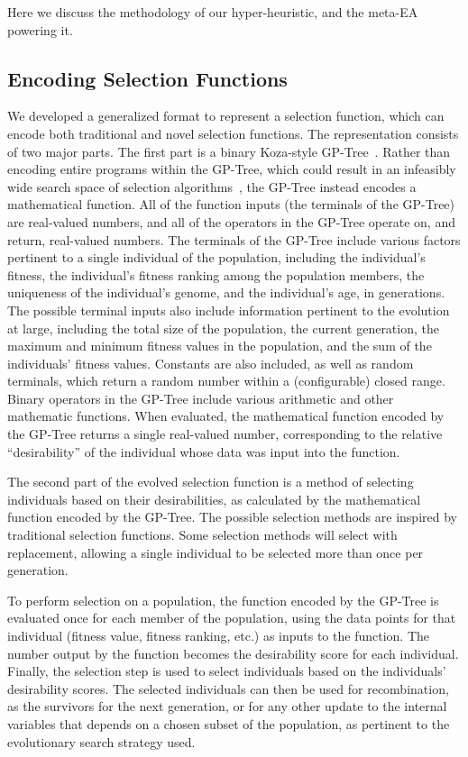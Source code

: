 \documentclass[sigconf]{acmart}
\begin{document}
Here we discuss the methodology of our hyper-heuristic, and the meta-EA powering it. 

\subsection{Encoding Selection Functions}
\label{Methodology-Encoding Selection Functions}

We developed a generalized format to represent a selection function, which can encode both traditional and novel selection functions. The representation consists of two major parts. The first part is a binary Koza-style GP-Tree~\citep{koza1994genetic}. Rather than encoding entire programs within the GP-Tree, which could result in an infeasibly wide search space of selection algorithms~\citep{woodward2009GPNotGood}, the GP-Tree instead encodes a mathematical function. All of the function inputs (the terminals of the GP-Tree) are real-valued numbers, and all of the operators in the GP-Tree operate on, and return, real-valued numbers. The terminals of the GP-Tree include various factors pertinent to a single individual of the population, including the individual's fitness, the individual's fitness ranking among the population members, the uniqueness of the individual's genome, and the individual's age, in generations. The possible terminal inputs also include information pertinent to the evolution at large, including the total size of the population, the current generation, the maximum and minimum fitness values in the population, and the sum of the individuals' fitness values. Constants are also included, as well as random terminals, which return a random number within a (configurable) closed range. Binary operators in the GP-Tree include various arithmetic and other mathematic functions. When evaluated, the mathematical function encoded by the GP-Tree returns a single real-valued number, corresponding to the relative ``desirability'' of the individual whose data was input into the function. 

The second part of the evolved selection function is a method of selecting individuals based on their desirabilities, as calculated by the mathematical function encoded by the GP-Tree. The possible selection methods are inspired by traditional selection functions. Some selection methods will select with replacement, allowing a single individual to be selected more than once per generation. 

To perform selection on a population, the function encoded by the GP-Tree is evaluated once for each member of the population, using the data points for that individual (fitness value, fitness ranking, etc.) as inputs to the function. The number output by the function becomes the desirability score for each individual. Finally, the selection step is used to select individuals based on the individuals' desirability scores. The selected individuals can then be used for recombination, as the survivors for the next generation, or for any other update to the internal variables that depends on a chosen subset of the population, as pertinent to the evolutionary search strategy used.
\end{document}
